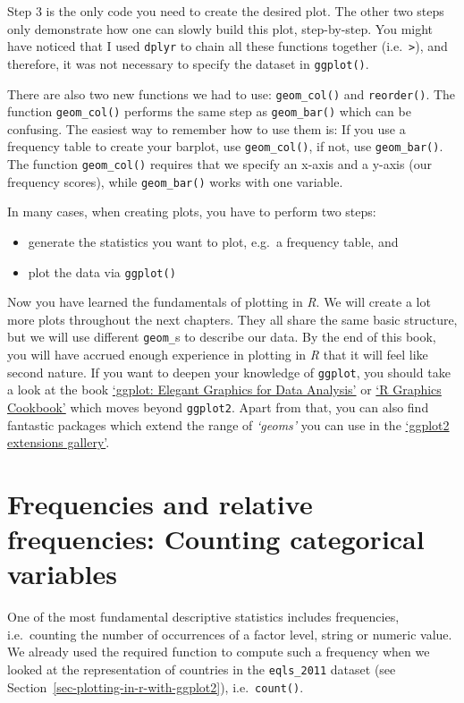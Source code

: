 \documentclass[
  letterpaper,
  DIV=11,
  numbers=noendperiod]{scrreprt}
\begin{document}
Step 3 is the only code you need to create the desired plot. The other
two steps only demonstrate how one can slowly build this plot,
step-by-step. You might have noticed that I used \texttt{dplyr} to chain
all these functions together (i.e.~\texttt{\textbar{}\textgreater{}}),
and therefore, it was not necessary to specify the dataset in
\texttt{ggplot()}.

There are also two new functions we had to use: \texttt{geom\_col()} and
\texttt{reorder()}. The function \texttt{geom\_col()} performs the same
step as \texttt{geom\_bar()} which can be confusing. The easiest way to
remember how to use them is: If you use a frequency table to create your
barplot, use \texttt{geom\_col()}, if not, use \texttt{geom\_bar()}. The
function \texttt{geom\_col()} requires that we specify an x-axis and a
y-axis (our frequency scores), while \texttt{geom\_bar()} works with one
variable.

In many cases, when creating plots, you have to perform two steps:

\begin{itemize}
\item
  generate the statistics you want to plot, e.g.~a frequency table, and
\item
  plot the data via \texttt{ggplot()}
\end{itemize}

Now you have learned the fundamentals of plotting in \emph{R}. We will
create a lot more plots throughout the next chapters. They all share the
same basic structure, but we will use different \texttt{geom\_}s to
describe our data. By the end of this book, you will have accrued enough
experience in plotting in \emph{R} that it will feel like second nature.
If you want to deepen your knowledge of \texttt{ggplot}, you should take
a look at the book \href{https://ggplot2-book.org}{`ggplot: Elegant
Graphics for Data Analysis'} or \href{https://r-graphics.org}{`R
Graphics Cookbook'} which moves beyond \texttt{ggplot2}. Apart from
that, you can also find fantastic packages which extend the range of
\emph{`geoms'} you can use in the
\href{https://exts.ggplot2.tidyverse.org/gallery/}{`ggplot2 extensions
gallery'}.

\section{Frequencies and relative frequencies: Counting categorical
variables}\label{sec-frequency}

One of the most fundamental descriptive statistics includes frequencies,
i.e.~counting the number of occurrences of a factor level, string or
numeric value. We already used the required function to compute such a
frequency when we looked at the representation of countries in the
\texttt{eqls\_2011} dataset (see
Section~\ref{sec-plotting-in-r-with-ggplot2}), i.e.~\texttt{count()}.
\end{document}

